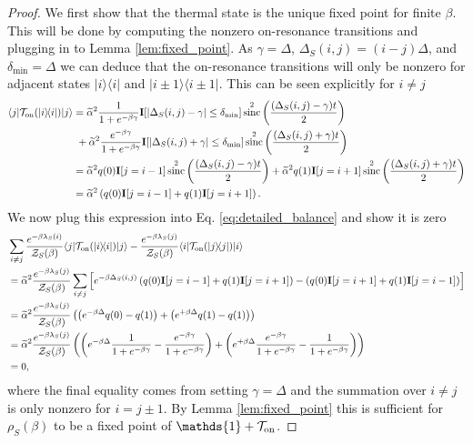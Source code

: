 \documentclass{article}
\newcommand{\on}{\rm on}
\newcommand{\ket}[1]{|#1\rangle}
\newcommand{\bra}[1]{\langle #1|}
\newcommand{\ketbra}[2]{| #1\rangle\! \langle #2|}
\newcommand{\TT}{\mathcal{T}}
\newcommand{\partfun}{\mathcal{Z}}
\newcommand{\identity}{\mathds{1}}
\DeclareMathOperator{\sinc}{sinc}
\begin{document}
\begin{proof}
    We first show that the thermal state is the unique fixed point for finite $\beta$. This will be done by computing the nonzero on-resonance transitions and plugging in to Lemma \ref{lem:fixed_point}. As $\gamma = \Delta$, $\Delta_S(i,j) = (i - j) \Delta$, and $\delta_{\min} = \Delta$ we can deduce that the on-resonance transitions will only be nonzero for adjacent states $\ketbra{i}{i}$ and $\ketbra{i \pm 1}{i \pm 1}$. This can be seen explicitly for $i \neq j$
    \begin{align}
        \bra{j} \TT_{\on}(\ketbra{i}{i}) \ket{j} &= \widetilde{\alpha}^2 \frac{1}{1 + e^{-\beta \gamma}} \mathbf{I}[|\Delta_S(i,j) - \gamma| \le \delta_{\min}]  \sinc^2\left(\frac{(\Delta_S(i,j) - \gamma)t}{2}\right) \nonumber \\
    &~+ \widetilde{\alpha}^2 \frac{e^{-\beta \gamma}}{1 + e^{-\beta \gamma}} \mathbf{I}[|\Delta_S(i,j) + \gamma| \le \delta_{\min}]  \sinc^2\left(\frac{(\Delta_S(i,j) + \gamma)t}{2}\right) \\
    &= \widetilde{\alpha}^2 q(0) \mathbf{I}[j = i - 1]  \sinc^2\left(\frac{(\Delta_S(i,j) - \gamma)t}{2}\right) + \widetilde{\alpha}^2 q(1) \mathbf{I}[j = i + 1]  \sinc^2\left(\frac{(\Delta_S(i,j) + \gamma)t}{2}\right) \\
    &= \widetilde{\alpha}^2 \left(q(0) \mathbf{I}[j = i - 1] +  q(1) \mathbf{I}[j = i + 1] \right). \label{eq:harmonic_oscillator_t_matrix}
    \end{align}
    We now plug this expression into Eq. \eqref{eq:detailed_balance} and show it is zero
    \begin{align}
        &\sum_{i \neq j} \frac{e^{-\beta \lambda_S(i)}}{\partfun_S(\beta)} \bra{j} \TT_{\on}(\ketbra{i}{i}) \ket{j} - \frac{e^{-\beta \lambda_S(j)}}{\partfun_S(\beta)} \bra{i} \TT_{\on}(\ketbra{j}{j}) \ket{i} \\
        &= \widetilde{\alpha}^2 \frac{e^{-\beta \lambda_S(j)}}{\partfun_S(\beta)} \sum_{i \neq j} \left[ e^{-\beta \Delta_S(i,j)} \left(q(0) \mathbf{I}[j = i - 1] +  q(1) \mathbf{I}[j = i + 1] \right) - \left(q(0) \mathbf{I}[j = i + 1] +  q(1) \mathbf{I}[j = i - 1] \right) \right] \\
        &= \widetilde{\alpha}^2 \frac{e^{-\beta \lambda_S(j)}}{\partfun_S(\beta)} \left( \left(e^{-\beta \Delta} q(0) - q(1) \right) + \left(e^{+\beta \Delta} q(1) - q(1) \right)\right) \\
        &= \widetilde{\alpha}^2 \frac{e^{-\beta \lambda_S(j)}}{\partfun_S(\beta)} \left( \left(e^{-\beta \Delta} \frac{1}{1 + e^{-\beta \gamma}} - \frac{e^{-\beta \gamma}}{1 + e^{-\beta \gamma}} \right) + \left(e^{+\beta \Delta} \frac{e^{-\beta \gamma}}{1 + e^{-\beta \gamma}} - \frac{1}{1 + e^{-\beta \gamma}} \right)\right) \\
        &= 0,
    \end{align}
    where the final equality comes from setting $\gamma = \Delta$ and the summation over $i \neq j$ is only nonzero for $i = j \pm 1$. By Lemma \ref{lem:fixed_point} this is sufficient for $\rho_S(\beta)$ to be a fixed point of $\identity + \TT_{\on}$. 
    

\end{proof}
\end{document}
